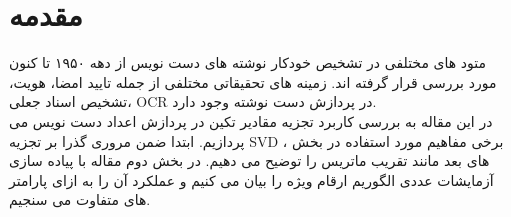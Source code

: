 
	\pagestyle{fancy}
	\renewcommand{\footrulewidth}{0pt}
	
	\section{مقدمه}
	
	متود های مختلفی در تشخیص خودکار نوشته های دست نویس از دهه ۱۹۵۰ تا کنون مورد بررسی قرار گرفته اند. زمینه های تحقیقاتی مختلفی از جمله تایید امضا، هویت، تشخیص اسناد جعلی، OCR  در پردازش دست نوشته وجود دارد. \\
	در این مقاله به بررسی کاربرد تجزیه مقادیر تکین در پردازش اعداد دست نویس می پردازیم. ابتدا ضمن مروری گذرا بر تجزیه SVD ، برخی مفاهیم مورد استفاده در بخش های بعد مانند تقریب ماتریس  را توضیح می دهیم. در بخش دوم مقاله با پیاده سازی آزمایشات عددی الگوریم ارقام ویژه  را بیان می کنیم و عملکرد آن را به ازای پارامتر های متفاوت می سنجیم. \\

